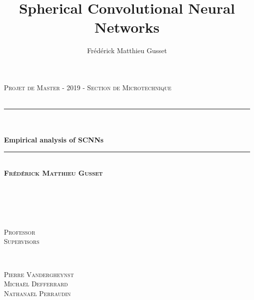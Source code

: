 \documentclass[11pt]{report}
\title{Spherical Convolutional Neural Networks}
\author{Frédérick Matthieu Gusset}
\makeatletter
\let\thetitle\@title
\makeatother
\begin{document}
\thispagestyle{empty}
\begin{center}
    \vspace*{0.9 cm}
    
    \vspace{7pt}
	{\large %
	\textsc{Projet de Master - 2019 - Section de Microtechnique\\[1 cm]~}\\[1 cm]				%
    }
	\rule{\linewidth}{0.2 mm} \\[1 cm]
	{\huge \bfseries \thetitle}\\
    \vspace{10pt}
    { \large \bfseries Empirical analysis of SCNNs }
    \vspace{10pt}%
    
	\rule{\linewidth}{0.2 mm} \\[1 cm]
	
	
    \textsc{\bfseries Fr\'ed\'erick Matthieu Gusset}
	\\[1.7 cm]
	
	\begin{minipage}{0.1\textwidth}
		\begin{flushleft} \large
			\textsc{}\\
            \vspace{10pt}
            \textsc{} \\
			\vspace{10pt}
			\end{flushleft}
			\end{minipage}~
		\begin{minipage}{0.3\textwidth}
		\begin{flushleft} \large
			\textsc{Professor}\\
            \vspace{10pt}
            \textsc{Supervisors} \\
			\vspace{10pt}
			\end{flushleft}
			\end{minipage}~
			\begin{minipage}{0.4\textwidth}
			\begin{flushright} 
			\vspace{10pt}\large
			\textsc{Pierre Vandergheynst}\\
            \vspace{10pt}
			\textsc{Michaël Defferrard}\\
			\textsc{Nathanaël Perraudin}
		\end{flushright}
	\end{minipage}\\[2 cm]
	

\end{center}
\end{document}
